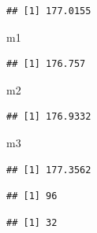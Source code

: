 \documentclass[]{book}
\newenvironment{Shaded}{\begin{snugshade}}{\end{snugshade}}
\newcommand{\KeywordTok}[1]{\textcolor[rgb]{0.13,0.29,0.53}{\textbf{{#1}}}}
\newcommand{\DecValTok}[1]{\textcolor[rgb]{0.00,0.00,0.81}{{#1}}}
\newcommand{\StringTok}[1]{\textcolor[rgb]{0.31,0.60,0.02}{{#1}}}
\newcommand{\NormalTok}[1]{{#1}}
\begin{document}
\begin{verbatim}
## [1] 177.0155
\end{verbatim}

\begin{Shaded}
\begin{Highlighting}[]
\NormalTok{m1}
\end{Highlighting}
\end{Shaded}

\begin{verbatim}
## [1] 176.757
\end{verbatim}

\begin{Shaded}
\begin{Highlighting}[]
\NormalTok{m2}
\end{Highlighting}
\end{Shaded}

\begin{verbatim}
## [1] 176.9332
\end{verbatim}

\begin{Shaded}
\begin{Highlighting}[]
\NormalTok{m3}
\end{Highlighting}
\end{Shaded}

\begin{verbatim}
## [1] 177.3562
\end{verbatim}

\begin{Shaded}
\end{Shaded}

\begin{verbatim}
## [1] 96
\end{verbatim}

\begin{Shaded}
\end{Shaded}

\begin{verbatim}
## [1] 32
\end{verbatim}

\begin{Shaded}
\end{Shaded}
\end{document}
